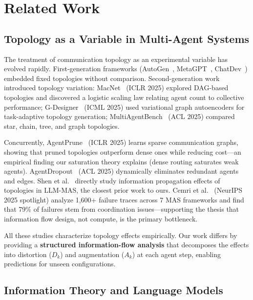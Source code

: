 \documentclass[conference]{IEEEtran}
\begin{document}
\section{Related Work}
\label{sec:related}

\subsection{Topology as a Variable in Multi-Agent Systems}

The treatment of communication topology as an experimental variable has evolved rapidly.
First-generation frameworks (AutoGen~\cite{wu2023autogen}, MetaGPT~\cite{hong2023metagpt}, ChatDev~\cite{qian2024chatdev}) embedded fixed topologies without comparison.
Second-generation work introduced topology variation:
MacNet~\cite{qian2025macnet} (ICLR 2025) explored DAG-based topologies and discovered a logistic scaling law relating agent count to collective performance;
G-Designer~\cite{yao2025gdesigner} (ICML 2025) used variational graph autoencoders for task-adaptive topology generation;
MultiAgentBench~\cite{multiagentbench2025} (ACL 2025) compared star, chain, tree, and graph topologies.

Concurrently, AgentPrune~\cite{agentprune2025} (ICLR 2025) learns sparse communication graphs, showing that pruned topologies outperform dense ones while reducing cost---an empirical finding our saturation theory explains (dense routing saturates weak agents).
AgentDropout~\cite{agentdropout2025} (ACL 2025) dynamically eliminates redundant agents and edges.
Shen et al.~\cite{shen2025infoprop} directly study information propagation effects of topologies in LLM-MAS, the closest prior work to ours.
Cemri et al.~\cite{cemri2025fail} (NeurIPS 2025 spotlight) analyze 1,600+ failure traces across 7 MAS frameworks and find that 79\% of failures stem from coordination issues---supporting the thesis that information flow design, not compute, is the primary bottleneck.

All these studies characterize topology effects empirically.
Our work differs by providing a \textbf{structured information-flow analysis} that decomposes the effects into distortion ($D_k$) and augmentation ($A_k$) at each agent step, enabling predictions for unseen configurations.

\subsection{Information Theory and Language Models}
\end{document}
